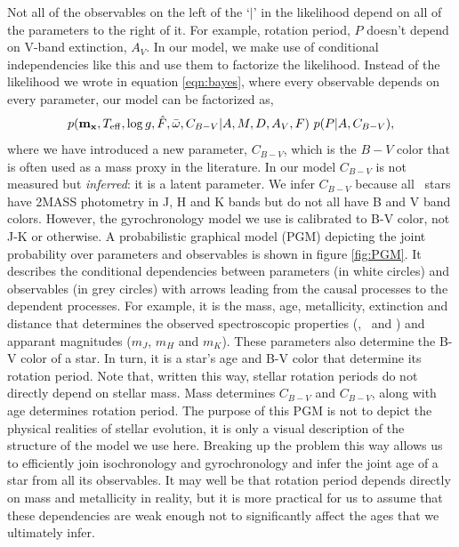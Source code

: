 Not all of the observables on the left of the `$|$' in the likelihood depend
on all of the parameters to the right of it.
For example, rotation period, $P$ doesn't depend on V-band extinction, $A_V$.
In our model, we make use of conditional independencies like this and use them
to factorize the likelihood.
Instead of the likelihood we wrote in equation \ref{eqn:bayes},
where every observable depends on every parameter, our model can be factorized
as,
\begin{equation}
    p({\bf m_x}, T_{\mathrm{eff}}, \log g, \hat{F}, \bar{\omega}, C_{B-V}|A,
    M, D, A_V, F)
    ~p(P|A, C_{B-V}),
\label{eqn:factorized}
\end{equation}
where we have introduced a new parameter, $C_{B-V}$, which is the $B-V$ color
that is often used as a mass proxy in the literature.
In our model $C_{B-V}$ is not measured but {\it inferred}: it is a latent
parameter.
We infer $C_{B-V}$ because all \kepler\ stars have 2MASS photometry in J, H
and K bands but do not all have B and V band colors.
However, the gyrochronology model we use is calibrated to B-V color, not J-K
or otherwise.
A probabilistic graphical model (PGM) depicting the joint probability over
parameters and observables is shown in figure \ref{fig:PGM}.
It describes the conditional dependencies between parameters (in white
circles) and observables (in grey circles) with arrows leading from the causal
processes to the dependent processes.
For example, it is the mass, age, metallicity, extinction and distance that
determines the observed spectroscopic properties (\teff, \logg\ and \feh)
and apparant magnitudes ($m_J$, $m_H$ and $m_K$).
These parameters also determine the B-V color of a star.
In turn, it is a star's age and B-V color that determine its rotation period.
Note that, written this way, stellar rotation periods do not directly depend
on stellar mass.
Mass determines $C_{B-V}$ and $C_{B-V}$, along with age determines rotation
period.
The purpose of this PGM is not to depict the physical realities of stellar
evolution, it is only a visual description of the structure of the model we
use here.
Breaking up the problem this way allows us to efficiently join isochronology
and gyrochronology and infer the joint age of a star from all its observables.
It may well be that rotation period depends directly on mass and metallicity
in reality, but it is more practical for us to assume that these dependencies are
weak enough not to significantly affect the ages that we ultimately infer.


